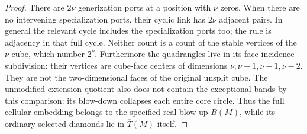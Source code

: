 \begin{proof}
There are $2\nu$ generization ports at a position with $\nu$ zeros. When
there are no intervening specialization ports, their cyclic link has
$2\nu$ adjacent pairs. In general the relevant cycle includes the
specialization ports too; the rule is adjacency in that full cycle. Neither
count is a count of the stable vertices of the $\nu$-cube, which number
$2^\nu$. Furthermore the quadrangles live in its face-incidence subdivision:
their vertices are cube-face centers of dimensions $\nu,\nu-1,\nu-1,\nu-2$.
They are not the two-dimensional faces of the original unsplit cube.
The unmodified extension quotient also does not contain the exceptional
bands by this comparison: its blow-down collapses each entire core
circle. Thus the full cellular embedding belongs to the specified real
blow-up $B(M)$, while its ordinary selected diamonds lie in
$\overline T(M)$ itself.
\end{proof}
